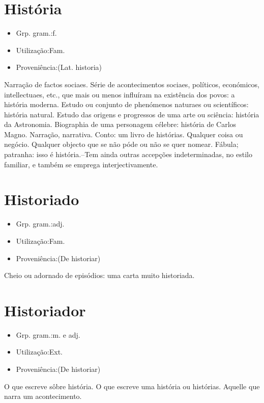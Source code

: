 \documentclass{article}
\begin{document}
\section{História}
\begin{itemize}
\item {Grp. gram.:f.}
\end{itemize}
\begin{itemize}
\item {Utilização:Fam.}
\end{itemize}
\begin{itemize}
\item {Proveniência:(Lat. \textunderscore historia\textunderscore )}
\end{itemize}
Narração de factos sociaes.
Série de acontecimentos sociaes, políticos, económicos, intellectuaes, etc., que mais ou menos influíram na existência dos povos: \textunderscore a história moderna\textunderscore .
Estudo ou conjunto de phenómenos naturaes ou scientíficos: \textunderscore história natural\textunderscore .
Estudo das origens e progressos de uma arte ou sciência: \textunderscore história da Astronomia\textunderscore .
Biographia de uma personagem célebre: \textunderscore história de Carlos Magno\textunderscore .
Narração, narrativa.
Conto: \textunderscore um livro de histórias\textunderscore .
Qualquer coisa ou negócio.
Qualquer objecto que se não póde ou não se quer nomear.
Fábula; patranha: \textunderscore isso é história\textunderscore .--Tem ainda outras accepções indeterminadas, no estilo familiar, e também se emprega interjectivamente.
\section{Historiado}
\begin{itemize}
\item {Grp. gram.:adj.}
\end{itemize}
\begin{itemize}
\item {Utilização:Fam.}
\end{itemize}
\begin{itemize}
\item {Proveniência:(De \textunderscore historiar\textunderscore )}
\end{itemize}
Cheio ou adornado de episódios: \textunderscore uma carta muito historiada\textunderscore .
\section{Historiador}
\begin{itemize}
\item {Grp. gram.:m.  e  adj.}
\end{itemize}
\begin{itemize}
\item {Utilização:Ext.}
\end{itemize}
\begin{itemize}
\item {Proveniência:(De \textunderscore historiar\textunderscore )}
\end{itemize}
O que escreve sôbre história.
O que escreve uma história ou histórias.
Aquelle que narra um acontecimento.
\end{document}
